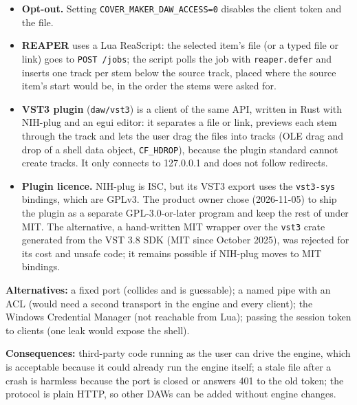 \begin{itemize}
        header, never on a command line (the REAPER script passes it to
        \texttt{curl.exe} through a header file in the user-only folder, deleted
        after each call).
  \item \textbf{Opt-out.} Setting \texttt{COVER\_MAKER\_DAW\_ACCESS=0} disables
        the client token and the file.
  \item \textbf{REAPER} uses a Lua ReaScript: the selected item's file (or a
        typed file or link) goes to \texttt{POST /jobs}; the script polls the job
        with \texttt{reaper.defer} and inserts one track per stem below the
        source track, placed where the source item's start would be, in the
        order the stems were asked for.
  \item \textbf{VST3 plugin} (\texttt{daw/vst3}) is a client of the same API,
        written in Rust with NIH-plug and an egui editor: it separates a file
        or link, previews each stem through the track and lets the user drag
        the files into tracks (OLE drag and drop of a shell data object,
        \texttt{CF\_HDROP}), because the plugin standard cannot create tracks.
        It only connects to 127.0.0.1 and does not follow redirects.
  \item \textbf{Plugin licence.} NIH-plug is ISC, but its VST3 export uses the
        \texttt{vst3-sys} bindings, which are GPLv3. The product owner chose
        (2026-11-05) to ship the plugin as a separate GPL-3.0-or-later program
        and keep the rest of \CM{} under MIT. The alternative, a hand-written
        MIT wrapper over the \texttt{vst3} crate generated from the VST 3.8 SDK
        (MIT since October 2025), was rejected for its cost and unsafe code;
        it remains possible if NIH-plug moves to MIT bindings.
\end{itemize}

\textbf{Alternatives:} a fixed port (collides and is guessable); a named pipe
with an ACL (would need a second transport in the engine and every client); the
Windows Credential Manager (not reachable from Lua); passing the session token
to clients (one leak would expose the shell).

\textbf{Consequences:} third-party code running as the user can drive the
engine, which is acceptable because it could already run the engine itself;
a stale file after a crash is harmless because the port is closed or answers
401 to the old token; the protocol is plain HTTP, so other DAWs can be added
without engine changes.
